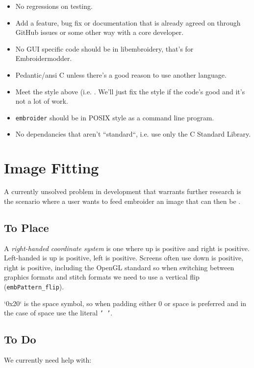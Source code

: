\documentclass[11pt]{report}
\begin{document}
\begin{itemize}
\item No regressions on testing.
\item Add a feature, bug fix or documentation that is already agreed on through
    GitHub issues or some other way with a core developer.
\item No GUI specific code should be in libembroidery, that's for Embroidermodder.
\item Pedantic/ansi C unless there's a good reason to use another language.
\item Meet the style above (i.e. \citep{pep7}.
    We'll just fix the style if the code's good and it's not a lot of work.
\item \texttt{embroider} should be in POSIX style as a command line program.
\item No dependancies that aren't ``standard``, i.e. use only the C Standard Library.
\end{itemize}

\section{Image Fitting}

A currently unsolved problem in development that warrants further research is
the scenario where a user wants to feed embroider an image that can then be .

\subsection{To Place}

A \emph{right-handed coordinate system}
is one where up is positive and right is
positive. Left-handed is up is positive, left is positive. Screens often use
down is positive, right is positive, including the OpenGL standard so when
switching between graphics formats and stitch formats we need to use a vertical
flip (\texttt{embPattern\_flip}).

`0x20` is the space symbol, so when padding either 0 or space is preferred and
in the case of space use the literal \texttt{' '}.

\subsection{To Do}

We currently need help with:
\end{document}
